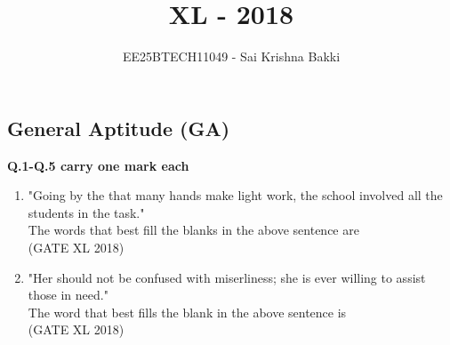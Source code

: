 \documentclass[14pt]{extarticle}
\title{\textbf{\Huge XL - 2018}}
\author{EE25BTECH11049 - Sai Krishna Bakki}
\date{}
\begin{document}
\maketitle

\begin{flushleft}
\begin{center}   
\section*{General Aptitude (GA)}
\end{center}

\textbf{Q.1-Q.5 carry one mark each}


\begin{enumerate}
\item "Going by the \underline{\hspace{2cm}} that many hands make light work, the school \underline{\hspace{2cm}} involved all the students in the task."\\ [2ex]
The words that best fill the blanks in the above sentence are\\
\hfill(GATE XL 2018)\\
\begin{enumerate}
\end{enumerate}

\item "Her \underline{\hspace{2cm}} should not be confused with miserliness; she is ever willing to assist those in need."\\[2ex] The word that best fills the blank in the above sentence is\\
\hfill(GATE XL 2018)\\
\begin{enumerate}
\end{enumerate}


\end{enumerate}
\end{flushleft}
\end{document}
